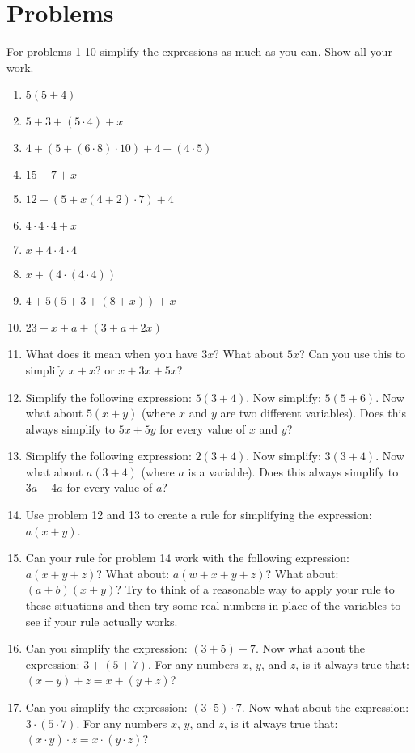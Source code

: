 \documentclass{article}
\begin{document}
\section*{Problems}
\begin{multicols*}{2}
    For problems 1-10 simplify the expressions as much as you can. Show all your work.
    \begin{enumerate}
        \item $5(5 + 4) $
        \item $5 + 3 + ( 5 \cdot 4) + x$
        \item $4 + ( 5 + (6 \cdot 8) \cdot 10) + 4 + (4 \cdot 5)$
        \item $15 + 7 + x$
        \item $12 + (5 + x(4 + 2) \cdot 7) + 4$
        \item $4 \cdot 4 \cdot 4 + x$
        \item $x + 4 \cdot 4 \cdot 4$
        \item $x + (4 \cdot (4 \cdot 4))$
        \item $4 + 5(5 + 3 + (8 + x)) + x$
        \item $23 + x + a + (3 + a + 2x)$
        \item What does it mean when you have $3x$? What about $5x$? Can you use this to simplify $x + x$? or $x + 3x + 5x$?
        \item Simplify the following expression: $5(3 + 4)$. Now simplify: $5(5 + 6)$. Now what about $5(x+y)$ (where $x$ and $y$ are two different variables). Does this always simplify to $5x + 5y$ for every value of $x$ and $y$? 
        \item Simplify the following expression: $2(3 + 4)$. Now simplify: $3(3 + 4)$. Now what about $a(3+4)$ (where $a$ is a variable). Does this always simplify to $3a + 4a$ for every value of $a$? 
        \item Use problem 12 and 13 to create a rule for simplifying the expression: $a(x+y)$. 
        \item Can your rule for problem 14 work with the following expression: $a(x+y+z)$? What about: $a(w+x+y+z)$? What about: $(a+b)(x+y)$? Try to think of a reasonable way to apply your rule to these situations and then try some real numbers in place of the variables to see if your rule actually works. 
        \item Can you simplify the expression: $(3 + 5) + 7$. Now what about the expression: $3 + (5+7)$. For any numbers $x$, $y$, and $z$, is it always true that: $(x+y) + z = x + (y + z)$? 
        \item Can you simplify the expression: $(3 \cdot 5) \cdot 7$. Now what about the expression: $ 3 \cdot (5 \cdot 7)$. For any numbers $x$, $y$, and $z$, is it always true that: $(x \cdot y) \cdot z = x \cdot (y \cdot z)$?
    \end{enumerate}
\end{multicols*}
\end{document}
